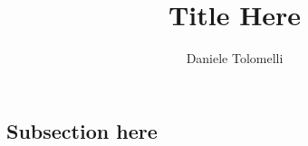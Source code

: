 \documentclass{article}
\begin{document}
\title{Title Here}
\author{Daniele Tolomelli}
\maketitle

\subsection*{Subsection here}
\end{document}
